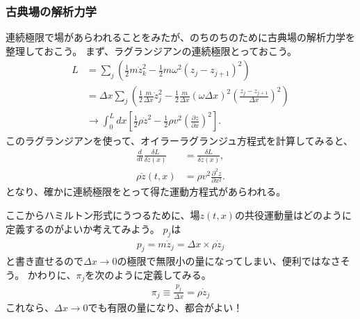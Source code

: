 \documentclass[10pt,a4paper]{jarticle}
\begin{document}
\subsubsection{古典場の解析力学}
連続極限で場があらわれることをみたが、のちのちのために古典場の解析力学を整理しておこう。
まず、ラグランジアンの連続極限とっておこう。
\begin{align}
L
&= \sum_j \left( \frac{1}{2} m \dot z_k^2 - \frac{1}{2} m \omega^2 (z_j - z_{j+1})^2 \right) \nonumber\\
&= \Delta x \sum_j \left( \frac{1}{2} \frac{m}{\Delta x} \dot z_j^2 - \frac{1}{2} \frac{m}{\Delta x} (\omega \Delta x)^2 \left( \frac{z_j - z_{j+1}}{\Delta x} \right)^2 \right) \nonumber\\
&\to \int_0^L dx \left[ \frac{1}{2}\rho {\dot z}^2 - \frac{1}{2} \rho v^2 \left( \frac{\partial z}{\partial x} \right)^2 \right].
\end{align}
このラグランジアンを使って、オイラーラグランジュ方程式を計算してみると、
\begin{align}
\frac{d}{dt} \frac{\delta L}{\delta \dot z(x)} &= \frac{\delta L}{\delta z(x)}, \nonumber\\
\rho\ddot z(t,x) &= \rho v^2 \frac{\partial^2 z}{\partial x^2}.
\end{align}
となり、確かに連続極限をとって得た運動方程式があらわれる。

ここからハミルトン形式にうつるために、場$z(t,x)$の共役運動量はどのように定義するのがよいか考えてみよう。
$p_j$は
\begin{align}
p_j = m \dot z_j = \Delta x \times \rho \dot z_j
\end{align}
と書き直せるので$\Delta x \to 0$の極限で無限小の量になってしまい、便利ではなさそう。
かわりに、$\pi_j$を次のように定義してみる。
\begin{align}
\pi_j \equiv \frac{p_j}{\Delta x} = \rho \dot z_j
\end{align}
これなら、$\Delta x \to 0$でも有限の量になり、都合がよい！
\end{document}
